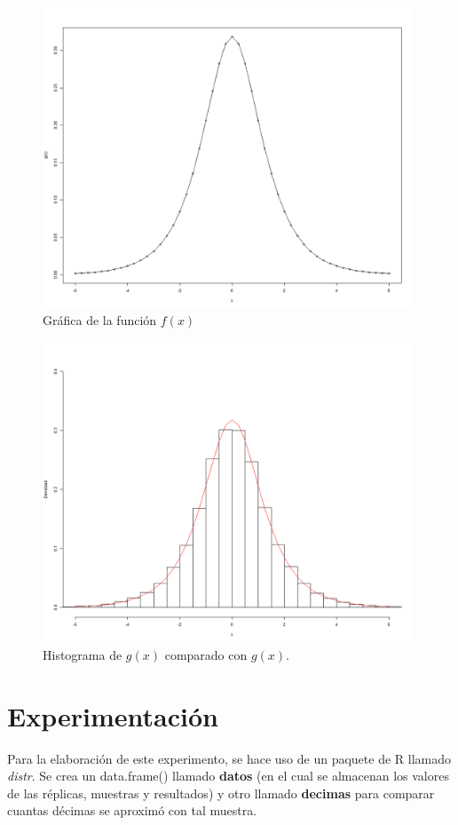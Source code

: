 \documentclass{article}
\begin{document}
\begin{figure}[h!]
\centering\includegraphics[width=110mm]{p5f.png}
\caption{Gr\'afica de la funci\'on $f(x)$}
\label{fig:fx}
\end{figure}

\begin{figure}[h!]
\centering\includegraphics[width=110mm]{p5m.png}
\caption{Histograma de $g(x)$ comparado con $g(x)$.}
\label{fig:gx}
\end{figure}

\newpage

\section{Experimentaci\'on}

Para la elaboraci\'on de este experimento, se hace uso de un paquete de R llamado \textit{distr}.
Se crea un data.frame() llamado \textbf{datos} (en el cual se almacenan los valores de las r\'eplicas, muestras y resultados) y otro llamado \textbf{decimas} para comparar cuantas d\'ecimas se aproxim\'o con tal muestra.
\end{document}
